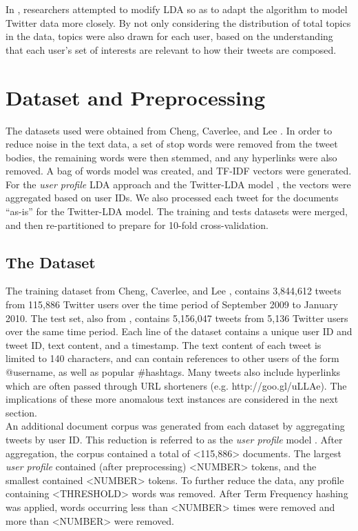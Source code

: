 \documentclass{acm_proc_article-sp}
\begin{document}
\hspace*{5mm}In \cite{zhao2011comparing}, researchers attempted to modify LDA so as to adapt the algorithm to model Twitter data more closely. By not only considering the distribution of total topics in the data, topics were also drawn for each user, based on the understanding that each user's set of interests are relevant to how their tweets are composed.

\section{Dataset and Preprocessing}
\hspace*{5mm}The datasets used were obtained from Cheng, Caverlee, and Lee \cite{cheng2010content}. In order to reduce noise in the text data, a set of stop words were removed from the tweet bodies, the remaining words were then stemmed, and any hyperlinks were also removed. A bag of words model was created, and TF-IDF vectors were generated. For the \textit{user profile} LDA approach \cite{hong2010empirical} and the Twitter-LDA model \cite{zhao2011comparing}, the vectors were aggregated based on user IDs. We also processed each tweet for the documents ``as-is'' for the Twitter-LDA model. The training and tests datasets were merged, and then re-partitioned to prepare for 10-fold cross-validation.

\subsection{The Dataset}
\hspace*{5mm}The training dataset from Cheng, Caverlee, and Lee \cite{cheng2010content}, contains 3,844,612 tweets from 115,886 Twitter users over the time period of September 2009 to January 2010. The test set, also from \cite{cheng2010content}, contains 5,156,047 tweets from 5,136 Twitter users over the same time period. Each line of the dataset contains a unique user ID and tweet ID, text content, and a timestamp. The text content of each tweet is limited to 140 characters, and can contain references to other users of the form @username, as well as popular \#hashtags. Many tweets also include hyperlinks which are often passed through URL shorteners (e.g. http://goo.gl/uLLAe). The implications of these more anomalous text instances are considered in the next section.\\
\hspace*{5mm}An additional document corpus was generated from each dataset by aggregating tweets by user ID. This reduction is referred to as the \textit{user profile} model \cite{hong2010empirical}. After aggregation, the corpus contained a total of <115,886> documents. The largest \textit{user profile} contained (after preprocessing) <NUMBER> tokens, and the smallest contained <NUMBER> tokens. To further reduce the data, any profile containing <THRESHOLD> words was removed. After Term Frequency hashing was applied, words occurring less than <NUMBER> times were removed and more than <NUMBER> were removed\cite{cheng2010content}.
 
\end{document}
